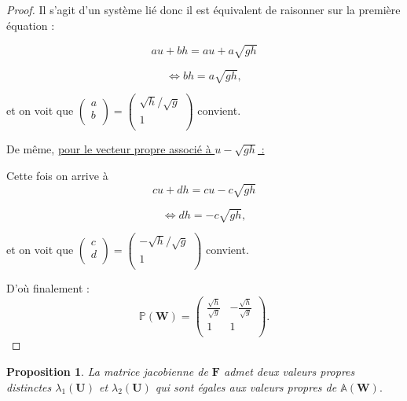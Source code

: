 \documentclass[
11pt, %
francais, %
singlespacing, %
headsepline, %
f%
]{MastersDoctoralThesis} %
\newtheorem{prop}{Proposition}
\theoremstyle{definition}
\begin{document}
\begin{proof}
Il s'agit d'un système lié donc il est équivalent de raisonner sur la première équation :

$$au+bh = au+ a\sqrt{gh}$$

$$\Leftrightarrow bh = a\sqrt{gh},$$


et on voit que $\begin{pmatrix}
   a\\
   b\\
\end{pmatrix} = \begin{pmatrix}
   \sqrt{h}/\sqrt{g}\\
   1\\
\end{pmatrix}$ convient.

De même, \underline{pour le vecteur propre associé à $u -\sqrt{gh}$ :}


Cette fois on arrive à $$cu+dh = cu- c\sqrt{gh}$$

$$\Leftrightarrow dh = -c\sqrt{gh},$$


et on voit que $\begin{pmatrix}
   c\\
   d\\
\end{pmatrix} = \begin{pmatrix}
   -\sqrt{h}/\sqrt{g}\\
   1\\
\end{pmatrix}$ convient.


D'où finalement : $$\mathbb{P}(\textbf{W}) =\begin{pmatrix}
   \frac{\sqrt{h}}{\sqrt{g}} & -\frac{\sqrt{h}}{\sqrt{g}} \\
   1 & 1  \\
\end{pmatrix}.$$

\end{proof}


\begin{prop}

La matrice jacobienne de $\textbf{F}$ admet deux valeurs propres distinctes $\lambda_{1}(\textbf{U})$ et $\lambda_{2}(\textbf{U})$  qui sont égales aux valeurs 
propres de $\mathbb{A}(\textbf{W}).$

\end{prop}
\end{document}
